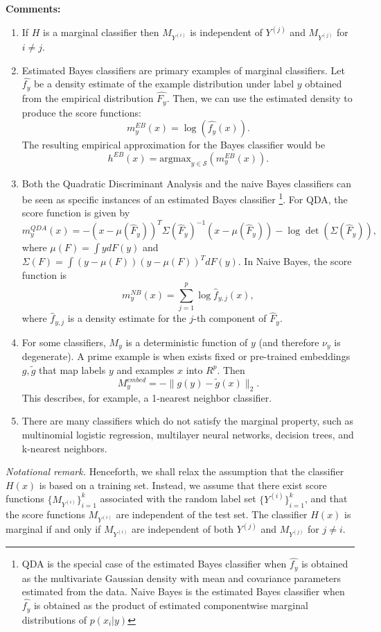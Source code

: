 \documentclass[twoside,11pt]{article}
\begin{document}
\textbf{Comments:}
\begin{enumerate}
\item If $H$ is a marginal classifier then 
$M_{Y^{(i)}}$ is independent of $Y^{(j)}$ and $M_{Y^{(j)}}$ for $i \neq j$.
\item Estimated Bayes classifiers are primary examples of marginal
  classifiers. Let $\hat{f_y}$ be a density estimate of the example
  distribution under label $y$ obtained from the empirical
  distribution $\hat{F_y}$. Then, we can use the estimated density to
  produce the score functions:
\[ m^{EB}_y(x) = \log(\hat{f_{y}}(x)).\]
The resulting empirical approximation for the Bayes classifier would
be
\[ h^{EB}(x) = \text{argmax}_{y \in \mathcal{S}}(m^{EB}_y(x)).\]
\item Both the Quadratic Discriminant Analysis and the naive Bayes
  classifiers can be seen as specific instances of an estimated Bayes
  classifier
\footnote{QDA is the special case of the estimated Bayes classifier
  when $\hat{f_y}$ is obtained as the multivariate Gaussian density
  with mean and covariance parameters estimated from the data.  Naive
  Bayes is the estimated Bayes classifier when $\hat{f_y}$ is obtained
  as the product of estimated componentwise marginal distributions of
  $p(x_i|y)$}.  For QDA, the score function is given by
\[
m_y^{QDA}(x) = -(x - \mu(\hat{F}_y))^T \Sigma(\hat{F}_y)^{-1} (x-\mu(\hat{F}_y)) - \log\det(\Sigma(\hat{F}_y)),
\]
where $\mu(F) = \int y dF(y)$ and $\Sigma(F) = \int (y-\mu(F))(y-\mu(F))^T dF(y)$.
In Naive Bayes, the score function is
\[
m^{NB}_y(x) = \sum_{j=1}^p \log \hat{f}_{y, j}(x),
\]
where $\hat{f}_{y, j}$ is a density estimate for the $j$-th component of
$\hat{F}_y$.
\item For some classifiers, $M_y$ is a deterministic function of $y$
  (and therefore $\nu_y$ is degenerate). A prime example is when
  exists fixed or pre-trained embeddings $g, \tilde{g}$ that map
  labels $y$ and examples $x$ into $R^p$. Then
\begin{equation}
M_y^{embed} = -\|g(y) - \tilde{g}(x)\|_2.
\end{equation}
This describes, for example, a 1-nearest neighbor classifier.
\item There are many classifiers which do not satisfy the marginal
  property, such as multinomial logistic regression, multilayer neural
  networks, decision trees, and k-nearest neighbors.
\end{enumerate}

\emph{Notational remark.}  Henceforth, we shall relax the assumption
that the classifier $H(x)$ is based on a training set.  Instead, we
assume that there exist score functions $\{M_{Y^{(i)}}\}_{i=1}^k$
associated with the random label set $\{Y^{(i)}\}_{i=1}^k$, and that
the score functions $M_{Y^{(i)}}$ are independent of the test set.
The classifier $H(x)$ is marginal if and only if $M_{Y^{(i)}}$ are
independent of both $Y^{(j)}$ and $M_{Y^{(j)}}$ for $j \neq i$.
\end{document}
